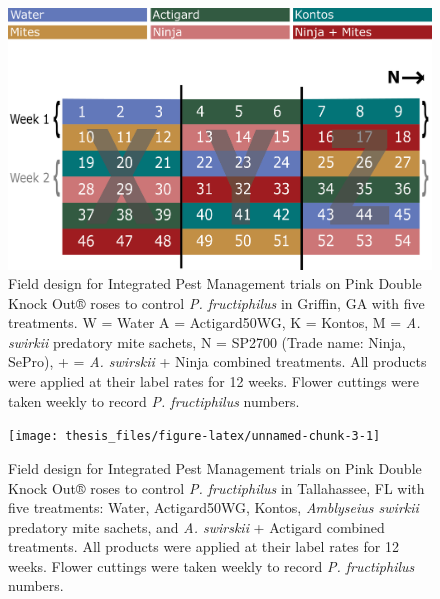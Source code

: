\documentclass[12pt,final,CPage]{ufthesis}
\begin{document}
{\begin{figure}
  {\centering \includegraphics[width=0.8\linewidth]{figure/rrv_ipm_plot_map_2019_griffin} 

  }

  \caption{Field design for Integrated Pest Management trials on Pink Double Knock Out® roses to control \textit{P. fructiphilus} in Griffin, GA with five treatments. W = Water A = Actigard50WG, K = Kontos, M = \textit{A. swirkii} predatory mite sachets, N = SP2700 (Trade name: Ninja, SePro), + = \textit{A. swirskii} + Ninja combined treatments. All products were applied at their label rates for 12 weeks. Flower cuttings were taken weekly to record \textit{P. fructiphilus} numbers.}\label{fig:ipm-griff}
  \end{figure}
  \begin{figure}

  {\centering \texttt{[image: thesis\_files/figure-latex/unnamed-chunk-3-1]} 

  }

  \caption{Field design for Integrated Pest Management trials on Pink Double Knock Out® roses to control \textit{P. fructiphilus} in Tallahassee, FL with five treatments: Water, Actigard50WG, Kontos, \textit{Amblyseius swirkii} predatory mite sachets, and \textit{A. swirskii} + Actigard combined treatments. All products were applied at their label rates for 12 weeks. Flower cuttings were taken weekly to record \textit{P. fructiphilus} numbers.}\label{fig:unnamed-chunk-3}
  \end{figure}
  \begin{figure}


\end{figure}}
\end{document}
